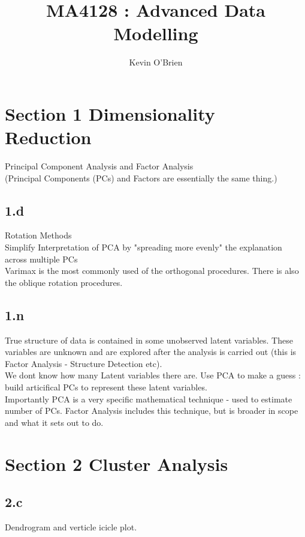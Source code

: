 \documentclass[11pt]{article} %
\title{MA4128 : Advanced Data Modelling}
\author{Kevin O'Brien}
\date{} %
\begin{document}
\maketitle
\section*{Section 1 Dimensionality Reduction}
Principal Component Analysis and Factor Analysis\\

(Principal Components (PCs) and Factors are essentially the same thing.)


\subsection*{1.d}
Rotation Methods\\
Simplify Interpretation of PCA by "spreading more evenly" the explanation across multiple PCs\\
Varimax is the most commonly used of the orthogonal procedures. There is also the oblique rotation procedures.

\subsection*{1.n}
True structure of data is contained in some unobserved latent variables. These variables are unknown and are explored after the analysis is carried out (this is Factor Analysis - Structure Detection etc). \\
We dont know how many Latent variables there are. Use PCA to make a guess : build articifical PCs to represent these latent variables.\\

Importantly PCA is a very specific mathematical technique - used to estimate number of PCs. Factor Analysis includes this technique, but is broader in scope and what it sets out to do.
\section*{Section 2 Cluster Analysis}


\subsection*{2.c}

Dendrogram and verticle icicle plot.\\
\end{document}
